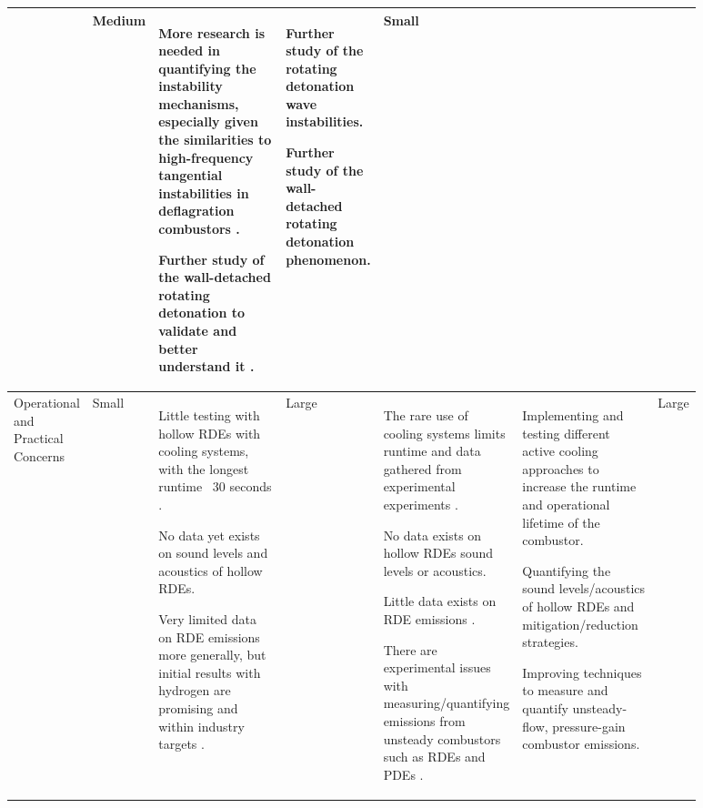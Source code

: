 \documentclass{article}
\begin{document}
\begin{landscape}
\begin{table}[ht]
\begin{tabular}{p{0.1\linewidth} | p{0.06\linewidth} | p{0.2\linewidth} | p{0.06\linewidth} | p{0.2\linewidth} | p{0.2\linewidth} | p{0.06\linewidth}}
        \par
        & \cellcolor[HTML]{FFE5D9}  Medium &
        More research is needed in quantifying the instability mechanisms, especially given the similarities to high-frequency tangential instabilities in deflagration combustors \cite{Zhang2021}.
        \par
        Further study of the wall-detached rotating detonation to validate and better understand it \cite{1Huang2023}.
        \par
        &  
        Further study of the rotating detonation wave instabilities.
        \par
        Further study of the wall-detached rotating detonation phenomenon.
        \par
        & \cellcolor[HTML]{FFCAD4} Small\\
        \midrule
        Operational and Practical Concerns & \cellcolor[HTML]{FFCAD4}  Small &
        Little testing with hollow RDEs with cooling systems, with the longest runtime ~30 seconds \cite{Goto2022,Stoddard2017}.
        \par
        No data yet exists on sound levels and acoustics of hollow RDEs. 
        \par
        Very limited data on RDE emissions more generally, but initial results with hydrogen are promising \cite{Stoddard2017,Ferguson2020} and within industry targets \cite{Cecere2023}.
        \par
        & \cellcolor[HTML]{D8E2DC} Large &
        The rare use of cooling systems limits runtime and data gathered from experimental experiments \cite{Stoddard2017,Goto2022}.
        \par
        No data exists on hollow RDEs sound levels or acoustics.
        \par
        Little data exists on RDE emissions \cite{Anand2019}.
        \par
        There are experimental issues with measuring/quantifying emissions from unsteady combustors such as RDEs and PDEs \cite{Anand2019}.
        \par
        &  
        Implementing and testing different active cooling approaches to increase the runtime and operational lifetime of the combustor.
        \par
        Quantifying the sound levels/acoustics of hollow RDEs and mitigation/reduction strategies.
        \par
        Improving techniques to measure and quantify unsteady-flow, pressure-gain combustor emissions.
        \par
        & \cellcolor[HTML]{D8E2DC} Large\\
		\bottomrule
	\end{tabular}
	\label{table2b}
\end{table}


\end{landscape}
\end{document}
